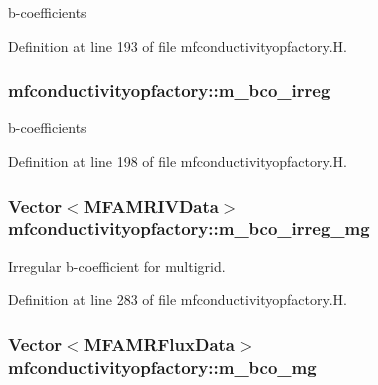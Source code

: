 b-\/coefficients 



Definition at line 193 of file mfconductivityopfactory.\+H.

\subsubsection[{\texorpdfstring{m\+\_\+bco\+\_\+irreg}{m_bco_irreg}}]{ mfconductivityopfactory\+::m\+\_\+bco\+\_\+irreg\hspace{0.3cm}{\ttfamily [protected]}}\hypertarget{classmfconductivityopfactory_a9ddf2f2df12ea3b01fcdc7c5d27bc91c}{}\label{classmfconductivityopfactory_a9ddf2f2df12ea3b01fcdc7c5d27bc91c}


b-\/coefficients 



Definition at line 198 of file mfconductivityopfactory.\+H.

\subsubsection[{\texorpdfstring{m\+\_\+bco\+\_\+irreg\+\_\+mg}{m_bco_irreg_mg}}]{\setlength{\rightskip}{0pt plus 5cm}Vector$<${\bf M\+F\+A\+M\+R\+I\+V\+Data}$>$ mfconductivityopfactory\+::m\+\_\+bco\+\_\+irreg\+\_\+mg\hspace{0.3cm}{\ttfamily [protected]}}\hypertarget{classmfconductivityopfactory_ab80af617da60384bc71be441600973e7}{}\label{classmfconductivityopfactory_ab80af617da60384bc71be441600973e7}


Irregular b-\/coefficient for multigrid. 



Definition at line 283 of file mfconductivityopfactory.\+H.

\subsubsection[{\texorpdfstring{m\+\_\+bco\+\_\+mg}{m_bco_mg}}]{\setlength{\rightskip}{0pt plus 5cm}Vector$<${\bf M\+F\+A\+M\+R\+Flux\+Data}$>$ mfconductivityopfactory\+::m\+\_\+bco\+\_\+mg\hspace{0.3cm}{\ttfamily [protected]}}\hypertarget{classmfconductivityopfactory_a4687ec93934cc9c0e1c7883b3aab9a68}{}\label{classmfconductivityopfactory_a4687ec93934cc9c0e1c7883b3aab9a68}


